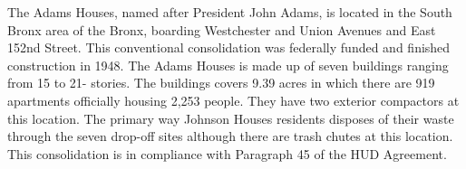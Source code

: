 The Adams Houses, named after President John Adams,  is located in the South Bronx area of the Bronx, boarding Westchester and Union Avenues and East 152nd Street. This conventional consolidation was federally funded and finished construction in 1948. The Adams Houses is made up of seven buildings ranging from 15 to 21- stories.  The buildings covers 9.39 acres in which there are 919 apartments officially housing 2,253 people. They have two exterior compactors at this location. The primary way Johnson Houses residents disposes of their waste through the seven drop-off sites although there are trash chutes at this location. This consolidation is in compliance with Paragraph 45 of the HUD Agreement.